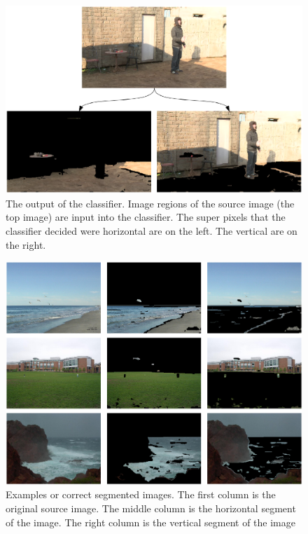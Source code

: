 \documentclass[times,10pt,twocolumn]{article}
\begin{document}
\begin{figure}[t]
  \includegraphics[keepaspectratio=true, width=\textwidth]{split.eps}
  \caption{The output of the classifier. Image regions of the source image
           (the top image) are input into the classifier. The super pixels
           that the classifier decided were horizontal are on the left. The
           vertical are on the right. }
  \label{fig:spliting}
\end{figure}

\begin{figure}[t]
  \includegraphics[keepaspectratio=true, width=\textwidth]{Good.eps}
  \caption{ Examples or correct segmented images. The first column is the
            original source image. The middle column is the horizontal segment
            of the image. The right column is the vertical segment of the image}
  \label{fig:correct}
\end{figure}
\end{document}
